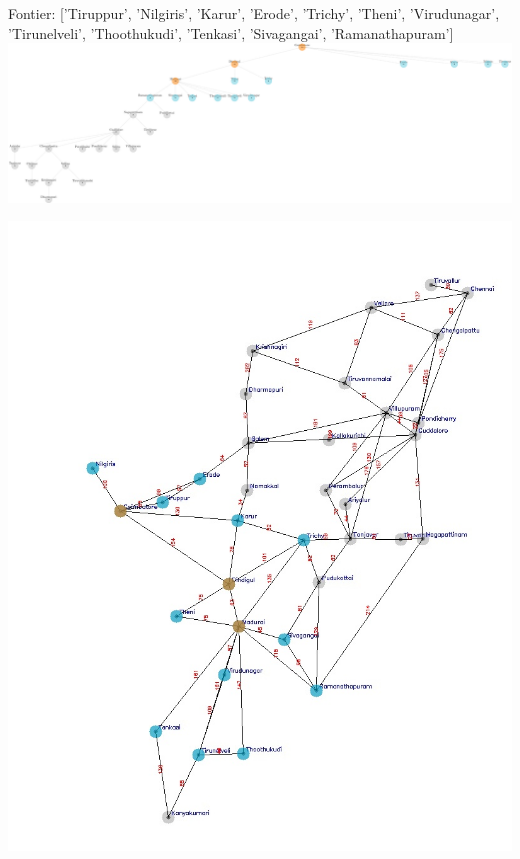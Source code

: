 \documentclass[xcolor=table]{beamer}
\begin{document}
\begin{frame}
  { \tiny Fontier: ['Tiruppur', 'Nilgiris', 'Karur', 'Erode', 'Trichy', 'Theni', 'Virudunagar', 'Tirunelveli', 'Thoothukudi', 'Tenkasi', 'Sivagangai', 'Ramanathapuram']}
  \includegraphics[width=1\textwidth]{../DFSNodes/5-1.png}
  \begin{center}
    \includegraphics[height=0.45\textheight]{../DFSoutput/tamilDFS3.jpg}
  \end{center}
\end{frame}
\end{document}
